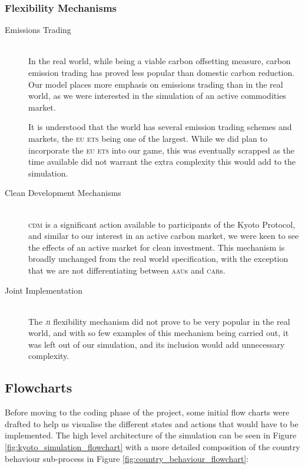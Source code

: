 \subsubsection{Flexibility Mechanisms}

\begin{description}
\item [Emissions Trading] \hfill \\ 
In the real world, while being a viable carbon offsetting measure, carbon emission trading has proved less popular than domestic carbon reduction. Our model places more emphasis on emissions trading than in the real world, as we were interested in the simulation of an active commodities market.

It is understood that the world has several emission trading schemes and markets, the \textsc{eu ets} being one of the largest. While we did plan to incorporate the \textsc{eu ets} into our game, this was eventually scrapped as the time available did not warrant the extra complexity this would add to the simulation.

\item [Clean Development Mechanisms] \hfill \\
\textsc{cdm} is a significant action available to participants of the Kyoto Protocol, and similar to our interest in an active carbon market, we were keen to see the effects of an active market for clean investment. This mechanism is broadly unchanged from the real world specification, with the exception that we are not differentiating between \textsc{aau}s and \textsc{car}s.

\item [Joint Implementation] \hfill \\ 
The \textsc{ji} flexibility mechanism did not prove to be very popular in the real world, and with so few examples of this mechanism being carried out, it was left out of our simulation, and its inclusion would add unnecessary complexity.
\end{description}	
	
\subsection{Flowcharts}
Before moving to the coding phase of the project, some initial flow charts were drafted to help us visualise the different states and actions that would have to be implemented. The high level architecture of the simulation can be seen in Figure \ref{fig:kyoto_simulation_flowchart} with a more detailed composition of the country behaviour sub-process in Figure \ref{fig:country_behaviour_flowchart}:

